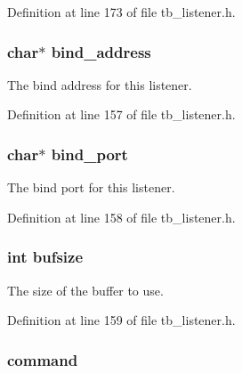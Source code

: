 Definition at line 173 of file tb\-\_\-listener.\-h.

\hypertarget{structtb__listener__t_ae15b37b2cdfd51bbb2719e4eb3ffb917}{
\subsubsection[{bind\-\_\-address}]{\setlength{\rightskip}{0pt plus 5cm}char$\ast$ bind\-\_\-address}}\label{structtb__listener__t_ae15b37b2cdfd51bbb2719e4eb3ffb917}


The bind address for this listener. 



Definition at line 157 of file tb\-\_\-listener.\-h.

\hypertarget{structtb__listener__t_a5c96fa09c995ca60f7b334c1842eb991}{
\subsubsection[{bind\-\_\-port}]{\setlength{\rightskip}{0pt plus 5cm}char$\ast$ bind\-\_\-port}}\label{structtb__listener__t_a5c96fa09c995ca60f7b334c1842eb991}


The bind port for this listener. 



Definition at line 158 of file tb\-\_\-listener.\-h.

\hypertarget{structtb__listener__t_a199ab88d4ca8eab30e1cb7d35edacca5}{
\subsubsection[{bufsize}]{\setlength{\rightskip}{0pt plus 5cm}int bufsize}}\label{structtb__listener__t_a199ab88d4ca8eab30e1cb7d35edacca5}


The size of the buffer to use. 



Definition at line 159 of file tb\-\_\-listener.\-h.

\hypertarget{structtb__listener__t_a70d431da3740b5dedad495c2843ba89e}{
\subsubsection[{command}]{ command}}\label{structtb__listener__t_a70d431da3740b5dedad495c2843ba89e}


